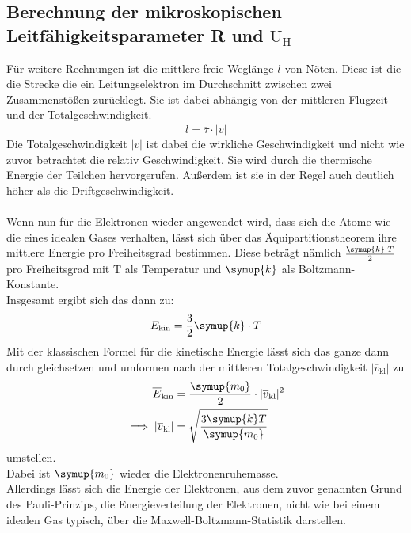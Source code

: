 \subsection{Berechnung der mikroskopischen Leitfähigkeitsparameter R und $\text{U}_\text{H}$} 

Für weitere Rechnungen ist die mittlere freie Weglänge $\overline{l}$ von Nöten.
Diese ist die die Strecke die ein Leitungselektron im Durchschnitt zwischen zwei Zusammenstößen zurücklegt. 
Sie ist dabei abhängig von der mittleren Flugzeit und der Totalgeschwindigkeit.
\begin{equation}
  \overline{l}= \overline{\tau} \cdot |v|
  \label{eqn:wegl}
\end{equation}
Die Totalgeschwindigkeit $|v|$ ist dabei die wirkliche Geschwindigkeit und nicht wie zuvor betrachtet  die relativ Geschwindigkeit.
Sie wird durch die thermische Energie der Teilchen hervorgerufen. Außerdem ist sie in der Regel auch deutlich höher als die Driftgeschwindigkeit.\\\\
\noindent
Wenn nun für die Elektronen wieder angewendet wird, dass sich die Atome wie die eines idealen Gases verhalten, lässt sich über das Äquipartitionstheorem
ihre mittlere Energie pro Freiheitsgrad bestimmen. Diese beträgt nämlich $\frac{\symup{k}\cdot T}{2}$ pro Freiheitsgrad mit T als Temperatur und 
$\symup{k}$ \cite{Boltzmann} als Boltzmann-Konstante.\\
Insgesamt ergibt sich das dann zu:
\begin{equation}
  E_\text{kin}=\frac{3}{2}\symup{k}\cdot T \nonumber
\end{equation}
Mit der klassischen Formel für die kinetische Energie lässt sich das ganze dann
durch gleichsetzen und umformen nach der mittleren Totalgeschwindigkeit $|\overline{v}_\text{kl}|$ zu
\begin{align}
  \overline{E}_\text{kin} &=\frac{\symup{m_0}}{2} \cdot |\overline{v}_\text{kl}|^2  \label{eqn:energ}\\
  \implies |\overline{v}_\text{kl}| &=\sqrt{\frac{3\symup{k}T}{\symup{m_0}}} \label{eqn:vtot}
\end{align}
umstellen.\\
Dabei ist $\symup{m_0}$ wieder die Elektronenruhemasse.\\
Allerdings lässt sich die Energie der Elektronen, aus dem zuvor genannten Grund des Pauli-Prinzips,
die Energieverteilung der Elektronen, nicht wie bei einem idealen Gas typisch, über die Maxwell-Boltzmann-Statistik darstellen.

